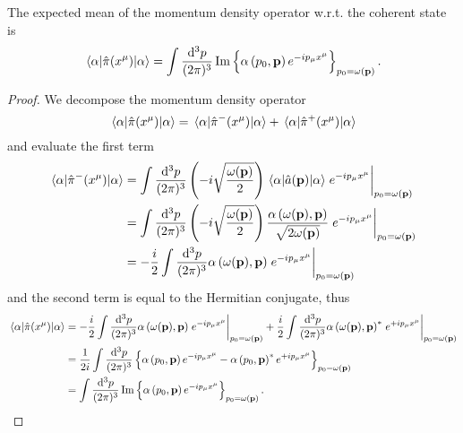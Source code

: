 \begin{lemma}
	The expected mean of the momentum density operator w.r.t. the coherent state is
	\begin{equation}
		\expval{\hat\pi(x^\mu)}{\alpha}
		=
		\int\frac{\dd[3]{p}}{(2\pi)^3}
		\operatorname{\operatorname{Im}}\left\{
			\alpha\left(p_0,\vb{p}\right)
			e^{-ip_\mu x^\mu}	
		\right\}_{p_0=\omega(\vb{p})}
		.
	\end{equation}
\end{lemma}
\begin{proof}
	We decompose the momentum density operator
	\begin{equation*}
		\expval{\hat\pi(x^\mu)}{\alpha}
		=
		\expval{\hat\pi^-(x^\mu)}{\alpha}
		+
		\expval{\hat\pi^+(x^\mu)}{\alpha}
	\end{equation*}
	and evaluate the first term
	\begin{equation*}
		\begin{split}
			\expval{\hat\pi^-(x^\mu)}{\alpha}
			&=
			\int\frac{\dd[3]{p}}{(2\pi)^3}
			\left(
				-i
				\sqrt{\frac{\omega(\vb{p})}{2}}
			\right)
			\expval{\hat{a}(\vb{p})}{\alpha}
			\eval{e^{-ip_\mu x^\mu}}_{p_0=\omega(\vb{p})}
			\\
			&=
			\int\frac{\dd[3]{p}}{(2\pi)^3}
			\left(
				-i
				\sqrt{\frac{\omega(\vb{p})}{2}}
			\right)
			\frac{\alpha\left(\omega(\vb{p}),\vb{p}\right)}{\sqrt{2\omega(\vb{p})}}
			\eval{e^{-ip_\mu x^\mu}}_{p_0=\omega(\vb{p})}
			\\
			&=
			-
			\frac{i}{2}
			\int\frac{\dd[3]{p}}{(2\pi)^3}
			\alpha\left(\omega(\vb{p}),\vb{p}\right)
			\eval{e^{-ip_\mu x^\mu}}_{p_0=\omega(\vb{p})}
		\end{split}
	\end{equation*}
	and the second term is equal to the Hermitian conjugate, thus
	\begin{equation*}
		\begin{split}
			\expval{\hat\pi(x^\mu)}{\alpha}
			&=
			-
			\frac{i}{2}
			\int\frac{\dd[3]{p}}{(2\pi)^3}
			\alpha\left(\omega(\vb{p}),\vb{p}\right)
			\eval{e^{-ip_\mu x^\mu}}_{p_0=\omega(\vb{p})}
			+
			\frac{i}{2}
			\int\frac{\dd[3]{p}}{(2\pi)^3}
			\alpha\left(\omega(\vb{p}),\vb{p}\right)^*
			\eval{e^{+ip_\mu x^\mu}}_{p_0=\omega(\vb{p})}
			\\
			&=
			\frac{1}{2i}
			\int\frac{\dd[3]{p}}{(2\pi)^3}
			\left\{
				\alpha\left(p_0,\vb{p}\right)
				e^{-ip_\mu x^\mu}
				-
				\alpha\left(p_0,\vb{p}\right)^*
				e^{+ip_\mu x^\mu}
			\right\}_{p_0=\omega(\vb{p})}
			\\
			&=
			\int\frac{\dd[3]{p}}{(2\pi)^3}
			\Im\left\{
				\alpha\left(p_0,\vb{p}\right)
				e^{-ip_\mu x^\mu}			
			\right\}_{p_0=\omega(\vb{p})}
			.
		\end{split}
	\end{equation*}
\end{proof}
